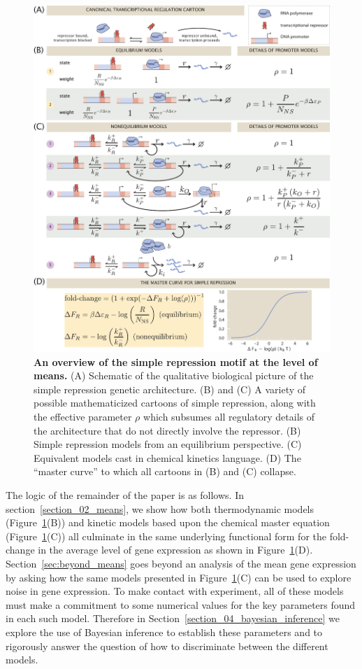 \afterpage{\clearpage}
\begin{figure}[p]
\centering
\includegraphics[width=\textwidth]{../../figures/main/fig01.pdf}
\caption{\textbf{An overview of the simple repression motif at the level of
means.} (A) Schematic of the qualitative biological picture of the simple
repression genetic architecture. (B) and (C) A variety of possible
mathematicized cartoons of simple repression, along with the effective parameter
$\rho$ which subsumes all regulatory details of the architecture that do not
directly involve the repressor. (B) Simple repression models from an equilibrium
perspective. (C) Equivalent models cast in chemical kinetics language. (D) The
``master curve'' to which all cartoons in (B) and (C) collapse.}
\label{fig1:means_cartoons}
\end{figure}

The logic of the remainder of the paper is as follows. In
section~\ref{section_02_means}, we show how both thermodynamic models
(Figure~\ref{fig1:means_cartoons}(B)) and kinetic models based upon the chemical
master equation (Figure~\ref{fig1:means_cartoons}(C)) all culminate in the same
underlying functional form for the fold-change in the average level of gene
expression as shown in Figure~\ref{fig1:means_cartoons}(D).
Section~\ref{sec:beyond_means} goes beyond an analysis of the mean gene
expression by asking how the same models presented in
Figure~\ref{fig1:means_cartoons}(C) can be used to explore noise in gene
expression. To make contact with experiment, all of these models must make a
commitment to some numerical values for the key parameters found in each such
model. Therefore in Section~\ref{section_04_bayesian_inference} we explore the
use of Bayesian inference to establish these parameters and to rigorously answer
the question of how to discriminate between the different models.